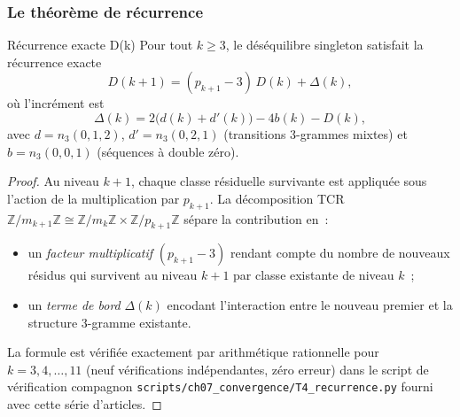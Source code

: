\documentclass[12pt,a4paper]{article}
\begin{document}
\subsubsection{Le théorème de récurrence}

\begin{thmbox}{Récurrence exacte D(k)}
\label{thm:recurrence}
Pour tout $k \geq 3$, le déséquilibre singleton satisfait la récurrence
exacte
\begin{equation}
  D(k+1) = (p_{k+1} - 3)\,D(k) + \Delta(k),
  \label{eq:recurrence_D}
\end{equation}
où l'incrément est
\begin{equation}
  \Delta(k) = 2\bigl(d(k) + d'(k)\bigr) - 4b(k) - D(k),
  \label{eq:Delta}
\end{equation}
avec $d = n_3(0,1,2)$, $d' = n_3(0,2,1)$ (transitions 3-grammes mixtes)
et $b = n_3(0,0,1)$ (séquences à double zéro).

\begin{proof}
Au niveau $k+1$, chaque classe résiduelle survivante est appliquée
sous l'action de la multiplication par $p_{k+1}$. La décomposition
TCR $\mathbb{Z}/m_{k+1}\mathbb{Z} \cong \mathbb{Z}/m_k\mathbb{Z}
\times \mathbb{Z}/p_{k+1}\mathbb{Z}$ sépare la contribution en~:
\begin{itemize}[nosep]
\item un \emph{facteur multiplicatif} $(p_{k+1} - 3)$ rendant compte
  du nombre de nouveaux résidus qui survivent au niveau $k+1$ par
  classe existante de niveau $k$~;
\item un \emph{terme de bord} $\Delta(k)$ encodant l'interaction
  entre le nouveau premier et la structure 3-gramme existante.
\end{itemize}
La formule est vérifiée exactement par arithmétique rationnelle pour
$k = 3, 4, \ldots, 11$ (neuf vérifications indépendantes, zéro erreur)
dans le script de vérification compagnon
\texttt{scripts/ch07\_convergence/T4\_recurrence.py}
fourni avec cette série d'articles.
\end{proof}
\end{thmbox}
\end{document}
